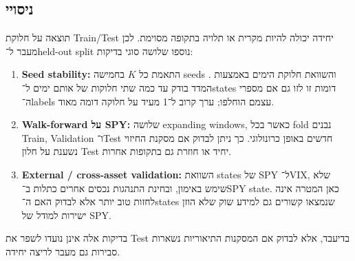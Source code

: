 \subsection{ניסויי }

תוצאה על חלוקת Train/Test יחידה יכולה להיות מקרית או תלויה בתקופה מסוימת. לכן מעבר ל־held-out split נוספו שלושה סוגי בדיקות:

\begin{enumerate}
    \item \textbf{Seed stability:} התאמת כל \(K\) בחמישה seeds והשוואת חלוקת הימים באמצעות . המדד בודק עד כמה שתי חלוקות של אותם ימים ל־states דומות זו לזו גם אם מספרי ה־labels עצמם הוחלפו; ערך קרוב ל־1 מעיד על חלוקה דומה מאוד.
    \item \textbf{Walk-forward על SPY:} שלושה expanding windows, כאשר בכל fold נבנים Train, Validation ו־Test חדשים באופן כרונולוגי. כך ניתן לבדוק אם מסקנת החיזוי נשענת על חלון Test יחיד או חוזרת גם בתקופות אחרות.
    \item \textbf{External / cross-asset validation:} השוואת states של SPY ל־VIX, שלא שימש באימון, ובחינת התנהגות נכסים אחרים כתלות ב־SPY state. כאן המטרה אינה לחזות טוב יותר אלא לבדוק האם ה־states שנמצאו קשורים גם למידע שוק שלא הוזן ישירות למודל של SPY.
\end{enumerate}

בדיקות אלה אינן נועדו לשפר את Test בדיעבד, אלא לבדוק אם המסקנות התיאוריות נשארות סבירות גם מעבר לריצה יחידה.
